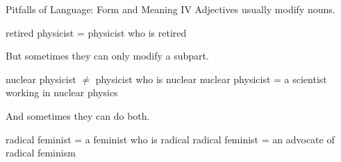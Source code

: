 \documentclass[xcolor={usenames,svgnames,x11names,dvipsnames,table}]{beamer}
\begin{document}
\begin{frame}{Pitfalls of Language: Form and Meaning IV}
    Adjectives usually modify nouns.
    \begin{exe}
        \small
        \ex retired physicist = physicist who is retired
    \end{exe}
    \pause
    But sometimes they can only modify a subpart. 
    \begin{exe}
        \small
        \ex
        \begin{xlist}
            \ex nuclear physicist $\neq$ physicist who is nuclear
            \ex nuclear physicist = a scientist working in nuclear physics
        \end{xlist}
    \end{exe}
    \pause
    And sometimes they can do both.
    \begin{exe}
        \small
        \ex
        \begin{xlist}
            \ex radical feminist = a feminist who is radical
            \ex radical feminist = an advocate of radical feminism
        \end{xlist}
    \end{exe}

    \begin{columns}
    \end{columns}
\end{frame}
\end{document}
